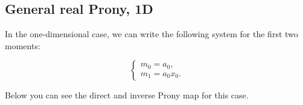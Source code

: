 \subsection{General real Prony, 1D}
In the one-dimensional case, we can write the following system for the first two moments:

$$
\begin{cases}
m_0 = a_0, \\
m_1 = a_0 x_0.
\end{cases}
$$
  
Below you can see the direct and inverse Prony map for this case. 
  
  